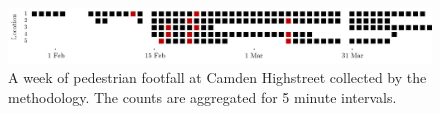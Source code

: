 \begin{figure}
	\begin{center}
		\includegraphics [width=\linewidth] {images/main_schedule.jpeg}
		\caption{A week of pedestrian footfall at Camden Highstreet collected by the methodology. The counts are aggregated for 5 minute intervals.}
		\label{main_study_counts}
	\end{center}
\end{figure}
